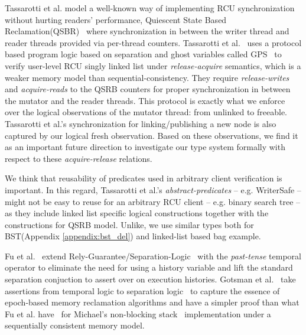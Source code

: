 Tassarotti et al. model a well-known way of implementing RCU synchronization without hurting readers' performance, \textsf{Quiescent State Based Reclamation}(QSBR)~\cite{urcu_ieee} where synchronization in between the writer thread and reader threads provided via per-thread counters. Tassarotti et al.~\cite{verrcu} uses a protocol based program logic based on separation and ghost variables called \textsf{GPS}~\cite{Turon:2014:GNW:2660193.2660243} to verify user-level \textsf{RCU} singly linked list under \emph{release-acquire} semantics, which is a weaker memory model than sequential-consistency. They require \textit{release-writes} and \textit{acquire-reads} to the QSRB counters for proper synchronization in between the mutator and the reader threads. This protocol is exactly what we enforce over the logical observations of the mutator thread: from \textsf{unlinked} to \textsf{freeable}. Tassarotti et al.'s synchronization for linking/publishing a new node is also captured by our logical \textsf{fresh} observation. Based on these observations, we find it as an important future direction to investigate our type system formally with respect to these \textit{acquire-release} relations.

 We think that reusability of predicates used in arbitrary client verification is important. In this regard, Tassarotti et al.'s \textit{abstract-predicates} -- e.g. WriterSafe -- might not be easy to reuse for an arbitrary RCU client -- e.g. binary search tree -- as they include linked list specific logical constructions together with the constructions for QSRB model. Unlike, we use similar types both for BST(Appendix \ref{appendix:bst_del}) and linked-list based bag example.

 Fu et al.~\cite{shao_temp} extend Rely-Guarantee/Separation-Logic~\cite{vafeiadis07,Feng:2007:RCS:1762174.1762193,Feng:2009:LRR:1480881.1480922} with the \textit{past-tense} temporal operator to eliminate the need for using a history variable and lift the standard separation conjuction to assert over on execution histories. Gotsman et al.~\cite{Gotsman:2013:VCM:2450268.2450289} take assertions from temporal logic to separation logic~\cite{vafeiadis07} to capture the essence of epoch-based memory reclamation algorithms and have a simpler proof than what Fu et al. have~\cite{shao_temp} for Michael's non-blocking stack~\cite{Michael:2004:HPS:987524.987595} implementation under a sequentially consistent memory model.

